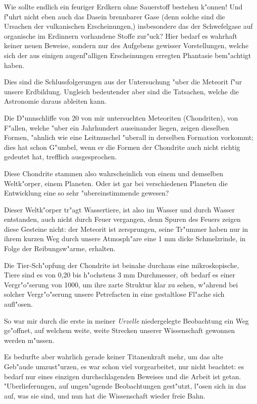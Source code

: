 \documentclass[a4paper, 11pt, oneside]{article}
\begin{document}
Wie sollte endlich ein feuriger Erdkern ohne Sauerstoff bestehen k"onnen! Und f"uhrt nicht eben auch das Dasein brennbarer Gase (denn solche sind die Ursachen der vulkanischen Erscheinungen,) insbesondere das der Schwefelgase auf organische im Erdinnern vorhandene Stoffe zur"uck? Hier bedarf es wahrhaft keiner neuen Beweise, sondern nur des Aufgebens gewisser Vorstellungen, welche sich der aus einigen augenf"alligen Erscheinungen erregten Phantasie bem"achtigt haben.

Dies sind die Schlussfolgerungen aus der Untersuchung "uber die Meteorit f"ur unsere Erdbildung. Ungleich bedeutender aber sind die Tatsachen, welche die Astronomie daraus ableiten kann.

Die D"unnschliffe von 20 von mir untersuchten Meteoriten (Chondriten), von F"allen, welche "uber ein Jahrhundert auseinander liegen, zeigen dieselben Formen, "ahnlich wie eine Leitmuschel "uberall in derselben Formation vorkommt; dies hat schon G"umbel, wenn er die Formen der Chondrite auch nicht richtig gedeutet hat, trefflich ausgesprochen.

Diese Chondrite stammen also wahrscheinlich von einem und demselben Weltk"orper, einem Planeten. Oder ist gar bei verschiedenen Planeten die Entwicklung eine so sehr "ubereinstimmende gewesen?

Dieser Weltk"orper tr"agt Wassertiere, ist also im Wasser und durch Wasser entstanden, auch nicht durch Feuer vergangen, denn Spuren des Feuers zeigen diese Gesteine nicht: der Meteorit ist zersprungen, seine Tr"ummer haben nur in ihrem kurzen Weg durch unsere Atmosph"are eine 1 mm dicke Schmelzrinde, in Folge der Reibungsw"arme, erhalten.

Die Tier-Sch"opfung der Chondrite ist beinahe durchaus eine mikroskopische, Tiere sind es von 0,20 bis h"ochstens 3 mm Durchmesser, oft bedarf es einer Vergr"o"serung von 1000, um ihre zarte Struktur klar zu sehen, w"ahrend bei solcher Vergr"o"serung unsere Petrefacten in eine gestaltlose Fl"ache sich aufl"osen.

So war mir durch die erste in meiner \emph{Urzelle} niedergelegte Beobachtung ein Weg ge"offnet, auf welchem weite, weite Strecken unserer Wissenschaft gewonnen werden m"ussen.

Es bedurfte aber wahrlich gerade keiner Titanenkraft mehr, um das alte Geb"aude umzust"urzen, es war schon viel vorgearbeitet, nur nicht beachtet: es bedarf nur eines einzigen durchschlagenden Beweises und die Arbeit ist getan. "Uberlieferungen, auf ungen"ugende Beobachtungen gest"utzt, l"osen sich in das auf, was sie sind, und nun hat die Wissenschaft wieder freie Bahn.
\clearpage
\end{document}
